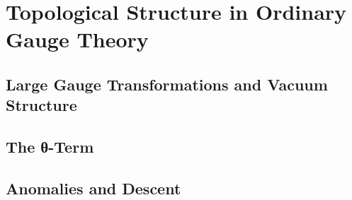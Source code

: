 %
%
%
%

\section{Topological Structure in Ordinary Gauge Theory}


\subsection{Large Gauge Transformations and Vacuum Structure}


\subsection{The θ-Term}


\subsection{Anomalies and Descent}

